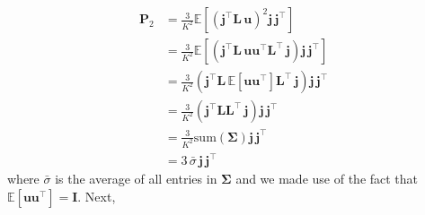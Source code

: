 \documentclass[modern]{aastex62}
\begin{document}
    \begin{align}
        \mathbf{P}_2 & = \frac{3}{K^2}\mathbb{E}\left[ \left(\mathbf{j}^\top \mathbf{L} \, \mathbf{u}\right)^2 \mathbf{j} \, \mathbf{j}^\top \right]
        \nonumber                                                                                                                                                                                   \\
                     & = \frac{3}{K^2}\mathbb{E}\left[\left(\mathbf{j}^\top \mathbf{L} \,  \mathbf{u} \mathbf{u}^\top  \mathbf{L}^\top \, \mathbf{j} \right)  \mathbf{j} \, \mathbf{j}^\top \right]
        \nonumber                                                                                                                                                                                   \\
                     & = \frac{3}{K^2}\left(\mathbf{j}^\top \mathbf{L} \, \mathbb{E}\left[ \mathbf{u} \mathbf{u}^\top \right] \mathbf{L}^\top \, \mathbf{j} \right)  \mathbf{j} \, \mathbf{j}^\top
        \nonumber                                                                                                                                                                                   \\
                     & = \frac{3}{K^2}\left(\mathbf{j}^\top \mathbf{L} \mathbf{L}^\top \, \mathbf{j} \right)  \mathbf{j} \, \mathbf{j}^\top
        \nonumber                                                                                                                                                                                   \\
                     & = \frac{3}{K^2}\mathrm{sum}(\mathbf{\Sigma}) \mathbf{j} \, \mathbf{j}^\top
        \nonumber                                                                                                                                                                                   \\
                     & = 3 \, \bar{\sigma} \, \mathbf{j} \, \mathbf{j}^\top
    \end{align}
    where $\bar{\sigma}$ is the average of all entries in $\pmb{\Sigma}$ and
    we made use of the fact that $\mathbb{E}\left[ \mathbf{u} \mathbf{u}^\top\right] = \mathbf{I}$.
    Next,
\end{document}
